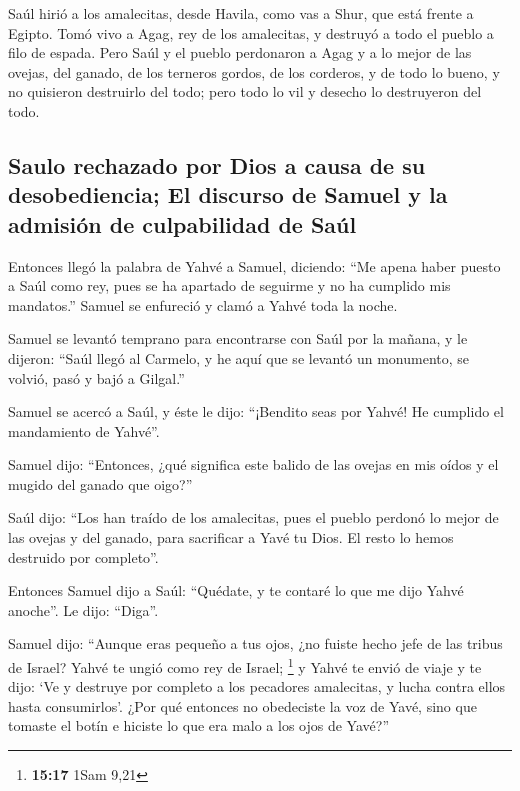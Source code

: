  Saúl hirió a los amalecitas, desde Havila, como vas a
Shur, que está frente a Egipto.  Tomó vivo a Agag, rey de
los amalecitas, y destruyó a todo el pueblo a filo de espada.
 Pero Saúl y el pueblo perdonaron a Agag y a lo mejor de
las ovejas, del ganado, de los terneros gordos, de los corderos, y de
todo lo bueno, y no quisieron destruirlo del todo; pero todo lo vil y
desecho lo destruyeron del todo.

\hypertarget{saulo-rechazado-por-dios-a-causa-de-su-desobediencia-el-discurso-de-samuel-y-la-admisiuxf3n-de-culpabilidad-de-sauxfal}{%
\subsection{Saulo rechazado por Dios a causa de su desobediencia; El
discurso de Samuel y la admisión de culpabilidad de
Saúl}\label{saulo-rechazado-por-dios-a-causa-de-su-desobediencia-el-discurso-de-samuel-y-la-admisiuxf3n-de-culpabilidad-de-sauxfal}}

 Entonces llegó la palabra de Yahvé a Samuel, diciendo:
 ``Me apena haber puesto a Saúl como rey, pues se ha
apartado de seguirme y no ha cumplido mis mandatos.'' Samuel se
enfureció y clamó a Yahvé toda la noche.

 Samuel se levantó temprano para encontrarse con Saúl por
la mañana, y le dijeron: ``Saúl llegó al Carmelo, y he aquí que se
levantó un monumento, se volvió, pasó y bajó a Gilgal.''

 Samuel se acercó a Saúl, y éste le dijo: ``¡Bendito seas
por Yahvé! He cumplido el mandamiento de Yahvé''.

 Samuel dijo: ``Entonces, ¿qué significa este balido de
las ovejas en mis oídos y el mugido del ganado que oigo?''

 Saúl dijo: ``Los han traído de los amalecitas, pues el
pueblo perdonó lo mejor de las ovejas y del ganado, para sacrificar a
Yavé tu Dios. El resto lo hemos destruido por completo''.

 Entonces Samuel dijo a Saúl: ``Quédate, y te contaré lo
que me dijo Yahvé anoche''. Le dijo: ``Diga''.

 Samuel dijo: ``Aunque eras pequeño a tus ojos, ¿no
fuiste hecho jefe de las tribus de Israel? Yahvé te ungió como rey de
Israel; \footnote{\textbf{15:17} 1Sam 9,21}  y Yahvé te
envió de viaje y te dijo: `Ve y destruye por completo a los pecadores
amalecitas, y lucha contra ellos hasta consumirlos'. 
¿Por qué entonces no obedeciste la voz de Yavé, sino que tomaste el
botín e hiciste lo que era malo a los ojos de Yavé?''


